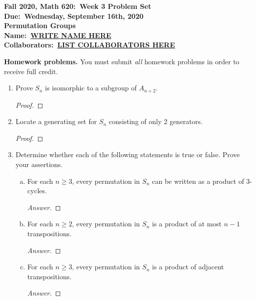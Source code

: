 \documentclass{article}
\theoremstyle{definition}
\numberwithin{equation}{section}
\renewcommand\>{\rangle}
\newcommand\<{\langle}
\newcommand\0{\mathbf{0}}
\begin{document}
\begin{center}
\textbf{Fall 2020, Math 620:\ Week 3 Problem Set} \\
\textbf{Due:\ Wednesday, September 16th, 2020} \\
\textbf{Permutation Groups} \\
\textbf{Name:\ \underline{WRITE NAME HERE}} \\
\textbf{Collaborators:\ \underline{LIST COLLABORATORS HERE}}
\end{center}


\bigskip
\noindent
\textbf{Homework problems.}
You must submit \emph{all} homework problems in order to receive full credit.  

\begin{enumerate}[(H1)]
\item 
Prove $S_n$ is isomorphic to a subgroup of $A_{n+2}$.  

\begin{proof}

\end{proof}


\item 
Locate a generating set for $S_n$ consisting of only 2 generators.  

\begin{proof}

\end{proof}


\item 
Determine whether each of the following statements is true or false.  Prove your assertions.  

\begin{enumerate}[(a)]
\item 
For each $n \ge 3$, every permutation in $S_n$ can be written as a product of 3-cycles.  

\begin{proof}[Answer]

\end{proof}


\item 
For each $n \ge 2$, every permutation in $S_n$ is a product of at most $n-1$ transpositions.  

\begin{proof}[Answer]

\end{proof}


\item 
For each $n \ge 3$, every permutation in $S_n$ is a product of adjacent transpositions.  

\begin{proof}[Answer]

\end{proof}

\end{enumerate}

\end{enumerate}
\end{document}

